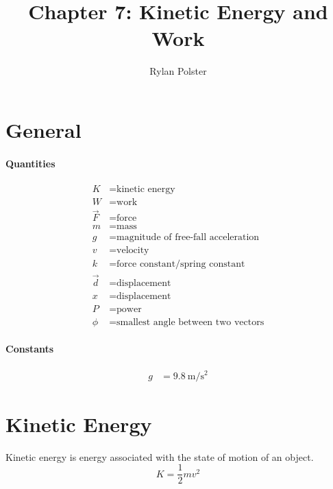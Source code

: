 \documentclass{article}
\title{Chapter 7: Kinetic Energy and Work}
\author{Rylan Polster}
\begin{document}
    \maketitle
    
    \section*{General}

        \paragraph{Quantities}
        \begin{align}
            K &= \text{kinetic energy} \nonumber\\
            W &= \text{work} \nonumber\\
            \vec{F} &= \text{force} \nonumber\\
            m &= \text{mass} \nonumber\\
            g &= \text{magnitude of free-fall acceleration} \nonumber\\
            v &= \text{velocity} \nonumber\\
            k &= \text{force constant/spring constant} \nonumber\\
            \vec{d} &= \text{displacement} \nonumber\\
            x &= \text{displacement} \nonumber\\
            P &= \text{power} \nonumber\\
            \phi &= \text{smallest angle between two vectors} \nonumber
        \end{align}

        \paragraph{Constants}
        \begin{align}
            g &= \SI[per-mode=symbol]{9.8}{\meter\per\square\second} \nonumber
        \end{align}

    \section{Kinetic Energy}

        Kinetic energy is energy associated with the state of motion of an object. 
        \begin{equation}
            K = \frac{1}{2} m v^2
        \end{equation}
\end{document}
